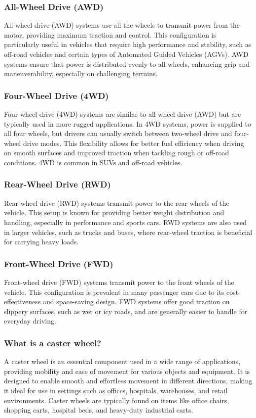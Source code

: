 \documentclass[../../main]{subfiles}
\begin{document}
\subsubsection{All-Wheel Drive (AWD)}
All-wheel drive (AWD) systems use all the wheels to transmit power from the motor, providing maximum traction and control. This configuration is particularly useful in vehicles that require high performance and stability, such as off-road vehicles and certain types of Automated Guided Vehicles (AGVs). AWD systems ensure that power is distributed evenly to all wheels, enhancing grip and maneuverability, especially on challenging terrains.

\subsubsection{Four-Wheel Drive (4WD)}

Four-wheel drive (4WD) systems are similar to all-wheel drive (AWD) but are typically used in more rugged applications. In 4WD systems, power is supplied to all four wheels, but drivers can usually switch between two-wheel drive and four-wheel drive modes. This flexibility allows for better fuel efficiency when driving on smooth surfaces and improved traction when tackling rough or off-road conditions. 4WD is common in SUVs and off-road vehicles.

\subsubsection{Rear-Wheel Drive (RWD)}
Rear-wheel drive (RWD) systems transmit power to the rear wheels of the vehicle. This setup is known for providing better weight distribution and handling, especially in performance and sports cars. RWD systems are also used in larger vehicles, such as trucks and buses, where rear-wheel traction is beneficial for carrying heavy loads.

\subsubsection{Front-Wheel Drive (FWD)}
Front-wheel drive (FWD) systems transmit power to the front wheels of the vehicle. This configuration is prevalent in many passenger cars due to its cost-effectiveness and space-saving design. FWD systems offer good traction on slippery surfaces, such as wet or icy roads, and are generally easier to handle for everyday driving.

\subsubsection{What is a caster wheel?}
A caster wheel is an essential component used in a wide range of applications, providing mobility and ease of movement for various objects and equipment. It is designed to enable smooth and effortless movement in different directions, making it ideal for use in settings such as offices, hospitals, warehouses, and retail environments. Caster wheels are typically found on items like office chairs, shopping carts, hospital beds, and heavy-duty industrial carts.
\end{document}
